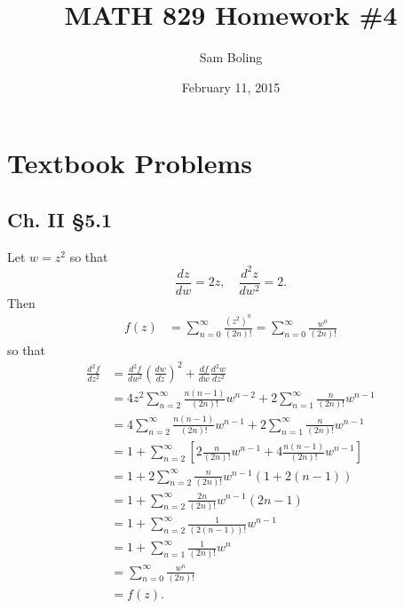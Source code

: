 \documentclass{article}
\title{MATH 829 Homework \#4}
\date{February 11, 2015}
\author{Sam Boling}
\newcounter{Problem}
\begin{document}
\begin{titlepage}
\maketitle
\end{titlepage}

\section{Textbook Problems}

\subsection*{Ch. II \S 5.1}
Let $w = z^2$ so that
$$
\frac{dz}{dw} = 2z, \quad
\frac{d^2z}{dw^2} = 2.
$$
Then
\begin{align*}
   f(z)
&= \sum_{n=0}^\infty \frac{(z^2)^n}{(2n)!}
 = \sum_{n=0}^\infty \frac{w^n}{(2n)!}
\end{align*}
so that
\begin{align*}
   \frac{d^2 f}{dz^2}
&= \frac{d^2 f}{dw^2} \left(\frac{dw}{dz}\right)^2
 + \frac{df}{dw} \frac{d^2w}{dz^2} \\
&= 4z^2
   \sum_{n=2}^\infty
     \frac{n(n-1)}{(2n)!}
     w^{n-2}
 + 2
   \sum_{n=1}^\infty
     \frac{n}{(2n)!}
     w^{n-1} \\
&= 4
   \sum_{n=2}^\infty
     \frac{n(n-1)}{(2n)!}
     w^{n-1}
 + 2
   \sum_{n=1}^\infty
     \frac{n}{(2n)!}
     w^{n-1} \\
&= 1
 + \sum_{n=2}^\infty
     \left[
       2\frac{n}{(2n)!}
       w^{n-1}
     + 4\frac{n(n-1)}{(2n)!}
       w^{n-1}
     \right] \\
&= 1
 + 2
   \sum_{n=2}^\infty
     \frac{n}{(2n)!}
     w^{n-1}
     (1 + 2(n-1)) \\
&= 1
 + \sum_{n=2}^\infty
     \frac{2n}{(2n)!}
     w^{n-1}
     (2n-1) \\
&= 1
 + \sum_{n=2}^\infty
     \frac{1}{(2(n-1))!}
     w^{n-1} \\
&= 1
 + \sum_{n=1}^\infty
     \frac{1}{(2n)!}
     w^n \\
&= \sum_{n=0}^\infty
     \frac{w^n}{(2n)!} \\
&= f(z).
\end{align*}
\end{document}
